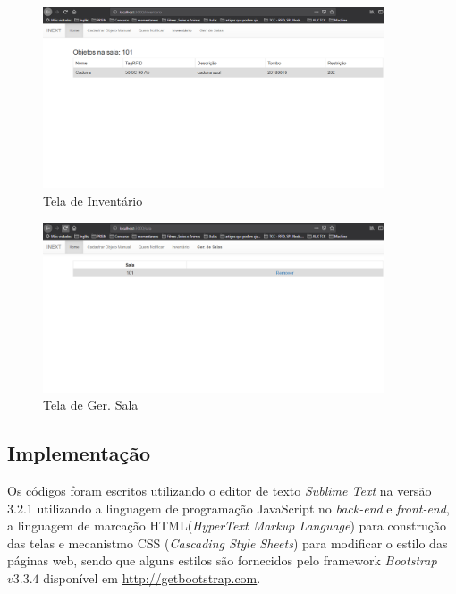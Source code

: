    \begin{figure}[H]
              \caption{\label{fig:tela_inventario}Tela de Inventário}
              \centering
              \includegraphics[width=0.9\textwidth]{Figuras/tela_inventario.png}
    \end{figure}
    
    \begin{figure}[H]
              \caption{\label{fig:tela_ger_sala}Tela de Ger. Sala}
              \centering
              \includegraphics[width=0.9\textwidth]{Figuras/tela_ger_sala.png}
    \end{figure}

\subsection{Implementação}
Os códigos foram escritos utilizando o editor de texto \textit{Sublime Text} na versão 3.2.1 utilizando a linguagem de programação JavaScript no \textit{back-end} e \textit{front-end}, a linguagem de marcação HTML(\textit{HyperText Markup Language}) para construção das telas e mecanistmo CSS (\textit{Cascading Style Sheets}) para modificar o estilo das páginas web, sendo que alguns estilos são fornecidos pelo framework \textit{Bootstrap} $v3.3.4$ disponível  em \url{http://getbootstrap.com}.

